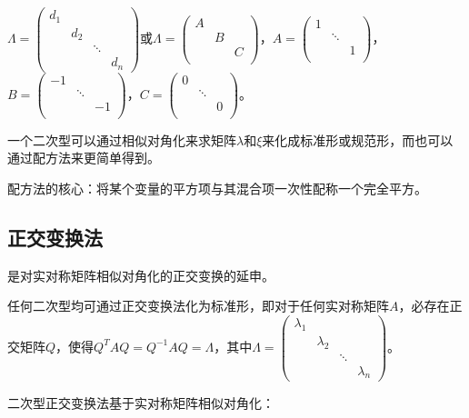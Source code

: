 \documentclass[UTF8, 12pt]{ctexart}
\begin{document}
$\Lambda=\left(\begin{array}{cccc}
    d_1 \\
     & d_2 \\
     & & \ddots \\
     & & & d_n
\end{array}\right)$或$\Lambda=\left(\begin{array}{ccccccccc}
    A \\
     & B \\
     & & C \\
\end{array}\right)$，$A=\left(\begin{array}{ccc}
    1 \\
     & \ddots \\
     & & 1 \\
\end{array}\right)$，$B=\left(\begin{array}{ccc}
    -1 \\
     & \ddots \\
     & & -1 \\
\end{array}\right)$，$C=\left(\begin{array}{ccc}
    0 \\
     & \ddots \\
     & & 0 \\
\end{array}\right)$。\medskip

一个二次型可以通过相似对角化来求矩阵$\lambda$和$\xi$来化成标准形或规范形，而也可以通过配方法来更简单得到。

配方法的核心：将某个变量的平方项与其混合项一次性配称一个完全平方。

\subsection{正交变换法}

是对实对称矩阵相似对角化的正交变换的延申。

任何二次型均可通过正交变换法化为标准形，即对于任何实对称矩阵$A$，必存在正交矩阵$Q$，使得$Q^TAQ=Q^{-1}AQ=\Lambda$，其中$\Lambda=\left(\begin{array}{cccc}
    \lambda_1 \\
     & \lambda_2 \\
     & & \ddots \\
     & & & \lambda_n
\end{array}\right)$。

二次型正交变换法基于实对称矩阵相似对角化：
\end{document}
